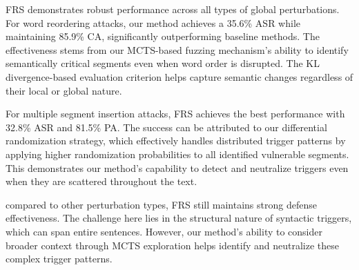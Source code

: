 \begin{table}[h]
\centering
\caption{Results under different types of global perturbations}
\label{tab:global_results}
\end{table}

FRS demonstrates robust performance across all types of global perturbations. For word reordering attacks, our method achieves a 35.6\% ASR while maintaining 85.9\% CA, significantly outperforming baseline methods. The effectiveness stems from our MCTS-based fuzzing mechanism's ability to identify semantically critical segments even when word order is disrupted. The KL divergence-based evaluation criterion helps capture semantic changes regardless of their local or global nature.

For multiple segment insertion attacks, FRS achieves the best performance with 32.8\% ASR and 81.5\% PA. The success can be attributed to our differential randomization strategy, which effectively handles distributed trigger patterns by applying higher randomization probabilities to all identified vulnerable segments. This demonstrates our method's capability to detect and neutralize triggers even when they are scattered throughout the text.

compared to other perturbation types, FRS still maintains strong defense effectiveness. The challenge here lies in the structural nature of syntactic triggers, which can span entire sentences. However, our method's ability to consider broader context through MCTS exploration helps identify and neutralize these complex trigger patterns.

